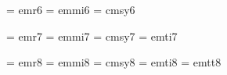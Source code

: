  \font\sixrm  = emr6		%
 \font\sixmi  = emmi6		%
    \skewchar{}	%
 \font\sixsy  = cmsy6		%
    \skewchar{}		%

 \font\sevrm  = emr7		%
 \font\sevmi  = emmi7		%
    \skewchar{}	%
 \font\sevsy  = cmsy7		%
    \skewchar{}		%
 \font\sevit  = emti7		%

 \font\egtrm  = emr8		%
 \font\egtmi  = emmi8		%
    \skewchar{}	%
 \font\egtsy  = cmsy8		%
    \skewchar{}		%
 \font\egtit  = emti8		%
 \font\egttt  = emtt8		%

